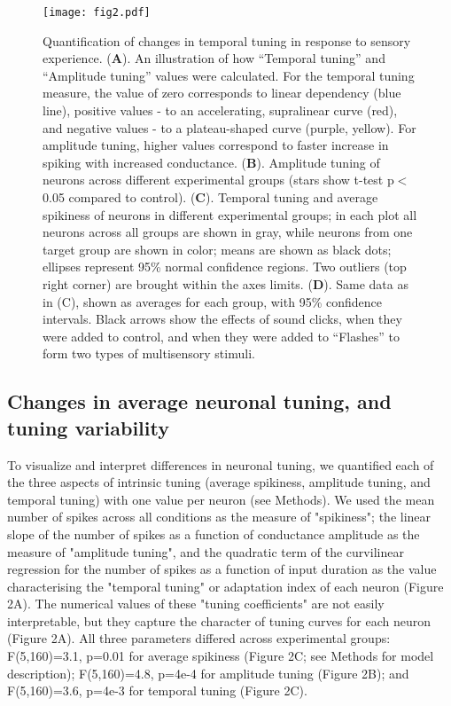 \documentclass{article}
\begin{document}
\begin{figure*}[!t]
\texttt{[image: fig2.pdf]}
\caption{
Quantification of changes in temporal tuning in response to sensory experience. (\textbf{A}). An illustration of how “Temporal tuning” and “Amplitude tuning” values were calculated. For the temporal tuning measure, the value of zero corresponds to linear dependency (blue line), positive values - to an accelerating, supralinear curve (red), and negative values - to a plateau-shaped curve (purple, yellow). For amplitude tuning, higher values correspond to faster increase in spiking with increased conductance. (\textbf{B}). Amplitude tuning of neurons across different experimental groups (stars show t-test p$<$0.05 compared to control). (\textbf{C}). Temporal tuning and average spikiness of neurons in different experimental groups; in each plot all neurons across all groups are shown in gray, while neurons from one target group are shown in color; means are shown as black dots; ellipses represent 95\% normal confidence regions. Two outliers (top right corner) are brought within the axes limits. (\textbf{D}). Same data as in (C), shown as averages for each group, with 95\% confidence intervals. Black arrows show the effects of sound clicks, when they were added to control, and when they were added to “Flashes” to form two types of multisensory stimuli.}
\end{figure*}

\subsection*{Changes in average neuronal tuning, and tuning variability}

To visualize and interpret differences in neuronal tuning, we quantified each of the three aspects of intrinsic tuning (average spikiness, amplitude tuning, and temporal tuning) with one value per neuron (see Methods). We used the mean number of spikes across all conditions as the measure of "spikiness"; the linear slope of the number of spikes as a function of conductance amplitude as the measure of "amplitude tuning", and the quadratic term of the curvilinear regression for the number of spikes as a function of input duration as the value characterising the "temporal tuning" or adaptation index of each neuron (Figure 2A). The numerical values of these "tuning coefficients" are not easily interpretable, but they capture the character of tuning curves for each neuron (Figure 2A). All three parameters differed across experimental groups: F(5,160)=3.1, p=0.01 for average spikiness (Figure 2C; see Methods for model description); F(5,160)=4.8, p=4e-4 for amplitude tuning (Figure 2B); and F(5,160)=3.6, p=4e-3 for temporal tuning (Figure 2C).
\end{document}

